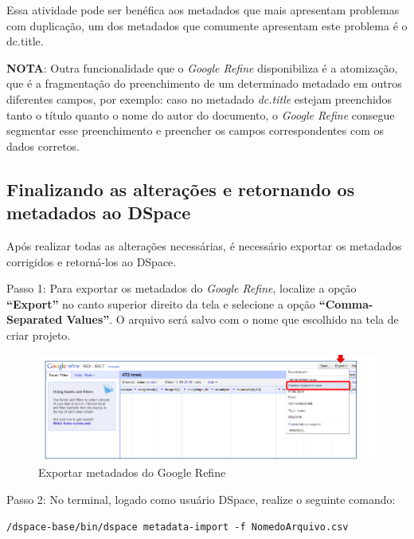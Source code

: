 \documentclass[12pt,hidelinks]{article}
\begin{document}
    Essa atividade pode ser benéfica aos metadados que mais apresentam problemas com duplicação, um dos metadados que comumente apresentam este problema é o dc.title.
    
    \textbf{NOTA}: Outra funcionalidade que o \textit{Google Refine} disponibiliza é a atomização, que é a fragmentação do preenchimento de um determinado metadado em outros diferentes campos, por exemplo: caso no metadado \textit{dc.title} estejam preenchidos tanto o título quanto o nome do autor do documento, o \textit{Google Refine} consegue segmentar esse preenchimento e preencher os campos correspondentes com os dados corretos.
    
    \singlespacing
    
    \subsection{Finalizando as alterações e retornando os metadados ao DSpace}
    
    Após realizar todas as alterações necessárias, é necessário exportar os metadados corrigidos e retorná-los ao DSpace.
    
    \singlespacing
    
    Passo 1: Para exportar os metadados do \textit{Google Refine}, localize a opção \textbf{“Export”} no canto superior direito da tela e selecione a opção \textbf{“Comma-Separated Values”}. O arquivo será salvo com o nome que escolhido na tela de criar projeto.
    
    \begin{figure}[!htp]
                \centering
                \includegraphics[scale=0.8]{figura/Figura207.png}
                \caption{Exportar metadados do Google Refine}
            \label{Rotulo}
        \end{figure}
    
    Passo 2: No terminal, logado como usuário DSpace, realize o seguinte comando:
    
    \begin{verbatim}
/dspace-base/bin/dspace metadata-import -f NomedoArquivo.csv
        \end{verbatim}
    
\end{document}
